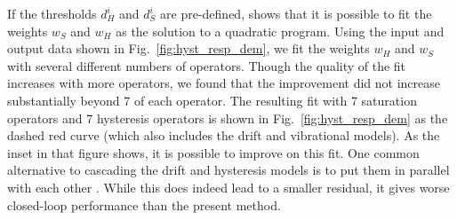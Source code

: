 \documentclass[twocolumn,twoside]{IEEEtran}
\begin{document}
If the thresholds $d_H^i$ and $d_S^i$ are pre-defined, \cite{kuhnen_modeling_2003} shows that it is possible to fit the weights $w_S$ and $w_H$ as the solution to a quadratic program. Using the input and output data shown in Fig.~\ref{fig:hyst_resp_dem}, we fit the weights $w_H$ and $w_S$ with several different numbers of operators. Though the quality of the fit increases with more operators, we found that the improvement did not increase substantially beyond 7 of each operator. 
The resulting fit with 7 saturation operators and 7 hysteresis operators is shown in Fig.~\ref{fig:hyst_resp_dem} as the dashed red curve (which also includes the drift and vibrational models). As the inset in that figure shows, it is possible to improve on this fit. One common alternative to cascading the drift and hysteresis models is to put them in parallel with each other \cite{mokaberi_compensation_2008, Krejci_inverse_2001}. While this does indeed lead to a smaller residual, it gives worse closed-loop performance than the present method.
\end{document}
